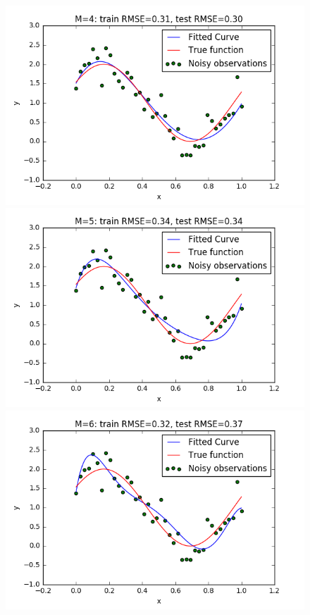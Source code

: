\documentclass[a4paper]{article}
\begin{document}
\newpage 
\begin{figure}[h!]
\begin{multicols}{2}
    \includegraphics[width=\linewidth]{Images/curvefit_m4_n_40.png}\par
    \includegraphics[width=\linewidth]{Images/curvefit_m5_n_40.png}\par
    \includegraphics[width=\linewidth]{Images/curvefit_m6_n_40.png}\par

\end{multicols}
\end{figure}
\end{document}
